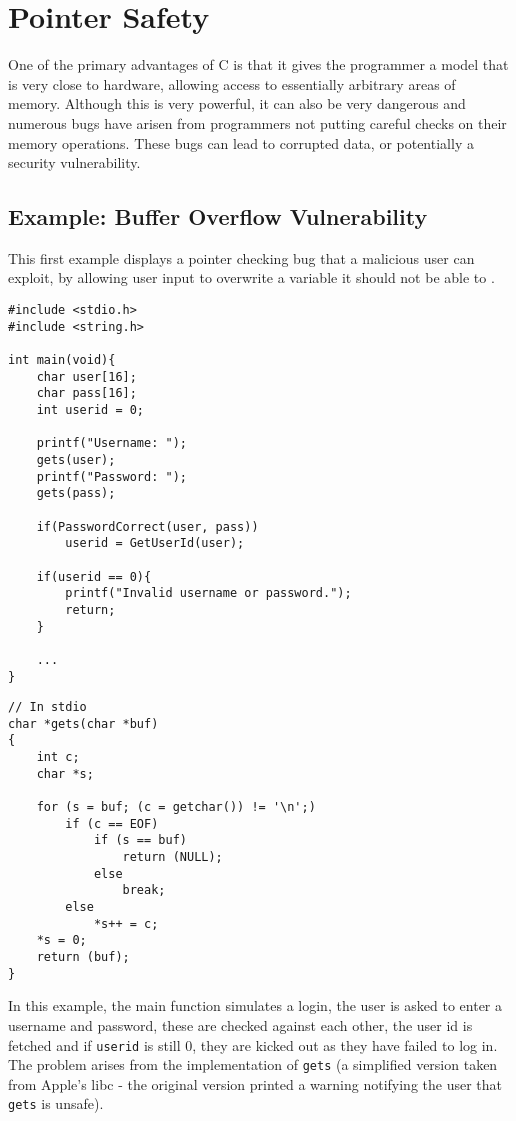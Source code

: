 \section{Pointer Safety}

One of the primary advantages of C is that it gives the programmer a model that is very close to hardware, allowing access to essentially arbitrary areas of memory.
Although this is very powerful, it can also be very dangerous and numerous bugs have arisen from programmers not putting careful checks on their memory operations.
These bugs can lead to corrupted data, or potentially a security vulnerability.

\subsection{Example: Buffer Overflow Vulnerability}

This first example displays a pointer checking bug that a malicious user can exploit, by allowing user input to overwrite a variable it should not be able to \cite{one1996smashing}.

\begin{verbatim}
#include <stdio.h>
#include <string.h>

int main(void){
    char user[16];
    char pass[16];
    int userid = 0;

    printf("Username: ");
    gets(user);
    printf("Password: ");
    gets(pass);

    if(PasswordCorrect(user, pass))
        userid = GetUserId(user);

    if(userid == 0){
        printf("Invalid username or password.");
        return;
    }

    ...
}
\end{verbatim}

\begin{verbatim}
// In stdio
char *gets(char *buf)
{
    int c;
    char *s;

    for (s = buf; (c = getchar()) != '\n';)
        if (c == EOF)
            if (s == buf)
                return (NULL);
            else
                break;
        else
            *s++ = c;
    *s = 0;
    return (buf);
}
\end{verbatim}

In this example, the main function simulates a login, the user is asked to enter a username and password, these are checked against each other, the user id is fetched and if \verb!userid! is still 0, they are kicked out as they have failed to log in.
The problem arises from the implementation of \verb!gets! (a simplified version taken from Apple's libc - the original version printed a warning notifying the user that \verb!gets! is unsafe).

